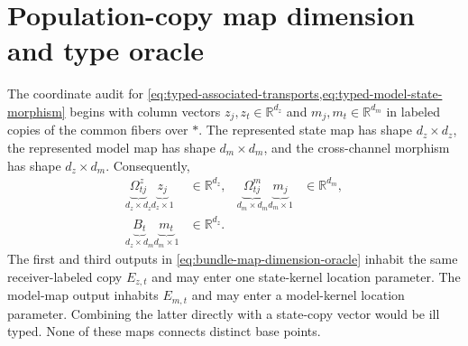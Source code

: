 \section{Population-copy map dimension and type oracle}

The coordinate audit for \cref{eq:typed-associated-transports,eq:typed-model-state-morphism} begins with column vectors $z_j,z_t\in\mathbb R^{d_z}$ and $m_j,m_t\in\mathbb R^{d_m}$ in labeled copies of the common fibers over $\ast$. The represented state map has shape $d_z\times d_z$, the represented model map has shape $d_m\times d_m$, and the cross-channel morphism has shape $d_z\times d_m$. Consequently,
\begin{equation}
\begin{aligned}
\underbrace{\Omega^z_{tj}}_{d_z\times d_z}
\underbrace{z_j}_{d_z\times 1}
&\in\mathbb R^{d_z},
&
\underbrace{\Omega^m_{tj}}_{d_m\times d_m}
\underbrace{m_j}_{d_m\times 1}
&\in\mathbb R^{d_m},\\
\underbrace{B_t}_{d_z\times d_m}
\underbrace{m_t}_{d_m\times 1}
&\in\mathbb R^{d_z}.
&&
\end{aligned}
\label{eq:bundle-map-dimension-oracle}
\end{equation}
The first and third outputs in \cref{eq:bundle-map-dimension-oracle} inhabit the same receiver-labeled copy $E_{z,t}$ and may enter one state-kernel location parameter. The model-map output inhabits $E_{m,t}$ and may enter a model-kernel location parameter. Combining the latter directly with a state-copy vector would be ill typed. None of these maps connects distinct base points.

